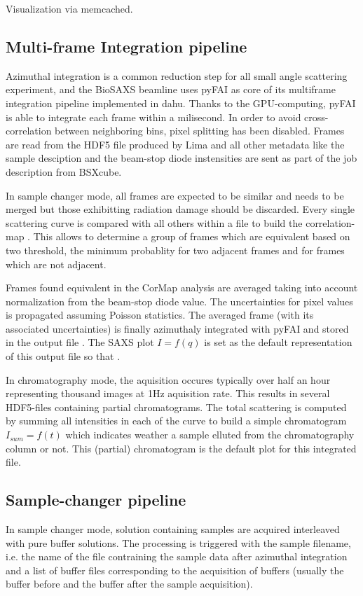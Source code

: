 \documentclass[preprint]{iucr}              %
\begin{document}
Visualization via memcached.

\subsection{Multi-frame Integration pipeline}

Azimuthal integration is a common reduction step for all small angle scattering experiment, and the BioSAXS beamline uses
pyFAI \cite{pyfai_2020} as core of its multiframe integration pipeline implemented in dahu.
Thanks to the GPU-computing, pyFAI is able to integrate each frame within a milisecond.
In order to avoid cross-correlation between neighboring bins, pixel splitting has been disabled.
Frames are read from the HDF5 file produced by Lima \cite{lima} and all other metadata like the sample desciption and the beam-stop diode instensities
are sent as part of the job description from BSXcube.  

In sample changer mode, all frames are expected to be similar and needs to be merged but those exhibitting radiation damage should be discarded.
Every single scattering curve is compared with all others within a file to build the correlation-map \cite{cormap}. 
This allows to determine a group of frames which are equivalent based on two threshold, the minimum probablity for two adjacent frames 
and for frames which are not adjacent. 

Frames found equivalent in the CorMap analysis are averaged taking into account normalization from the beam-stop diode value. 
The uncertainties for pixel values is propagated assuming Poisson statistics. 
The averaged frame (with its associated uncertainties) is finally azimuthaly integrated with pyFAI and stored in the output file . 
The SAXS plot $I = f(q)$ is set as the default representation of this output file so that .

In chromatography mode, the aquisition occures typically over half an hour representing thousand images at 1Hz aquisition rate. 
This results in several HDF5-files containing partial chromatograms.
The total scattering is computed by summing all intensities in each of the curve to build a simple chromatogram $I_{sum} = f(t)$ 
which indicates weather a sample elluted from the chromatography column or not. 
This (partial) chromatogram is the default plot for this integrated file.  

\subsection{Sample-changer pipeline}
In sample changer mode, solution containing samples are acquired interleaved with pure buffer solutions.
The processing is triggered with the sample filename, i.e. the name of the file contraining the sample data after azimuthal integration and a list of 
buffer files corresponding to the acquisition of buffers (usually the buffer before and the buffer after the sample acquisition). 
\end{document}
